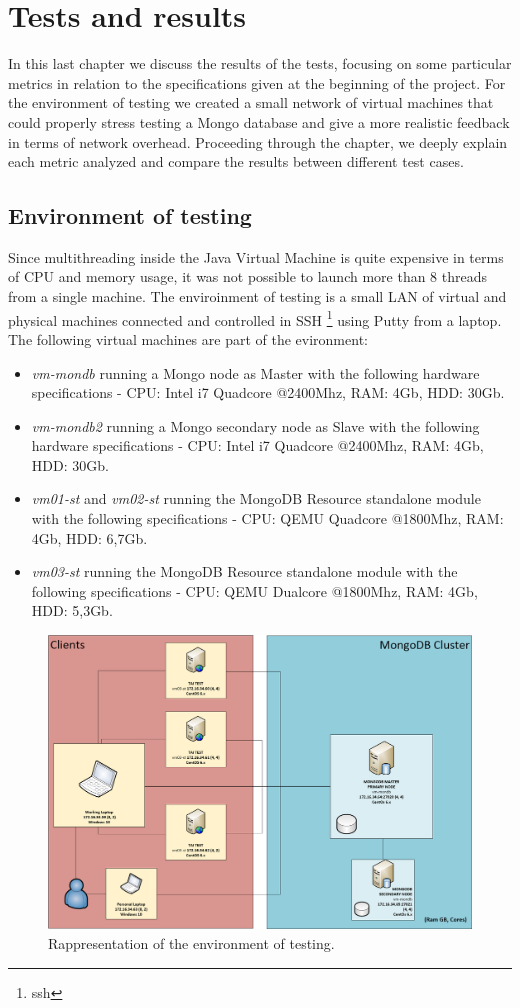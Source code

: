 \chapter{Tests and results}
\label{cha:4}
In this last chapter we discuss the results of the tests, focusing on some particular metrics in relation to the specifications given at the beginning of the project. For the environment of testing we created a small network of virtual machines that could properly stress testing a Mongo database and give a more realistic feedback in terms of network overhead.
Proceeding through the chapter, we deeply explain each metric analyzed and compare the results between different test cases.

\section{Environment of testing}
\label{sec:1}
Since multithreading inside the Java Virtual Machine is quite expensive in terms of CPU and memory usage, it was not possible to launch more than 8 threads from a single machine. 
The enviroinment of testing is a small LAN of virtual and physical machines connected and controlled in SSH \footnote{ssh} using Putty from a laptop.
The following virtual machines are part of the evironment: 
\begin{itemize}
	\item \textit{vm-mondb} running a Mongo node as Master with the following hardware specifications - CPU: Intel i7 Quadcore @2400Mhz, RAM: 4Gb, HDD: 30Gb.
	\item \textit{vm-mondb2} running a Mongo secondary node as Slave with the following hardware specifications - CPU: Intel i7 Quadcore @2400Mhz, RAM: 4Gb, HDD: 30Gb.
	\item \textit{vm01-st} and \textit{vm02-st} running the MongoDB Resource standalone module with the following specifications - CPU: QEMU Quadcore @1800Mhz, RAM: 4Gb, HDD: 6,7Gb.
	\item \textit{vm03-st} running the MongoDB Resource standalone module with the following specifications - CPU: QEMU Dualcore @1800Mhz, RAM: 4Gb, HDD: 5,3Gb.
\end{itemize}
\begin{figure}[H]
\includegraphics[scale=0.6]{my_architecture.png}
\centering
\caption{Rappresentation of the environment of testing.}
\end{figure}
